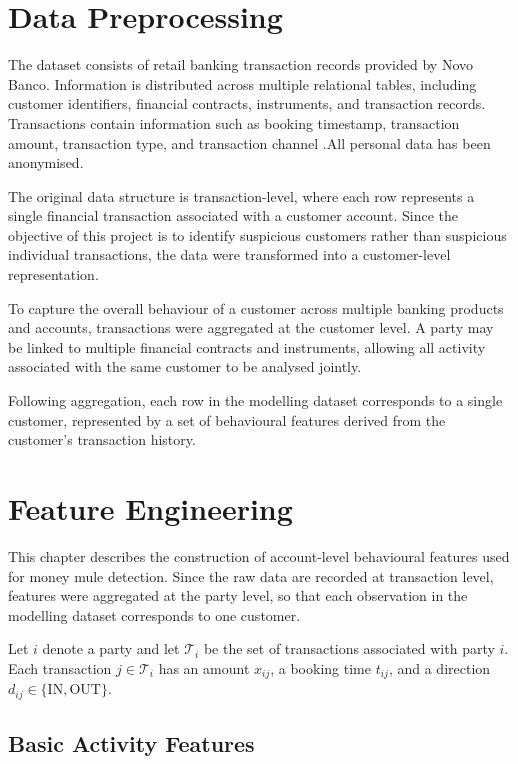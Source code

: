 \chapter{Data Preprocessing}
The dataset consists of retail banking transaction records provided by Novo Banco. Information is distributed across multiple relational tables, including customer identifiers, financial contracts, instruments, and transaction records. Transactions contain information such as booking timestamp, transaction amount, transaction type, and transaction channel .All personal data has been anonymised.

The original data structure is transaction-level, where each row represents a single financial transaction associated with a customer account. Since the objective of this project is to identify suspicious customers rather than suspicious individual transactions, the data were transformed into a customer-level representation.

To capture the overall behaviour of a customer across multiple banking products and accounts, transactions were aggregated at the customer level. A party may be linked to multiple financial contracts and instruments, allowing all activity associated with the same customer to be analysed jointly.

Following aggregation, each row in the modelling dataset corresponds to a single customer, represented by a set of behavioural features derived from the customer's transaction history.
\chapter{Feature Engineering}

This chapter describes the construction of account-level behavioural features used for money mule detection. Since the raw data are recorded at transaction level, features were aggregated at the party level, so that each observation in the modelling dataset corresponds to one customer.

Let \(i\) denote a party and let \(\mathcal{T}_i\) be the set of transactions associated with party \(i\). Each transaction \(j \in \mathcal{T}_i\) has an amount \(x_{ij}\), a booking time \(t_{ij}\), and a direction \(d_{ij} \in \{\mathrm{IN}, \mathrm{OUT}\}\).

\section{Basic Activity Features}


